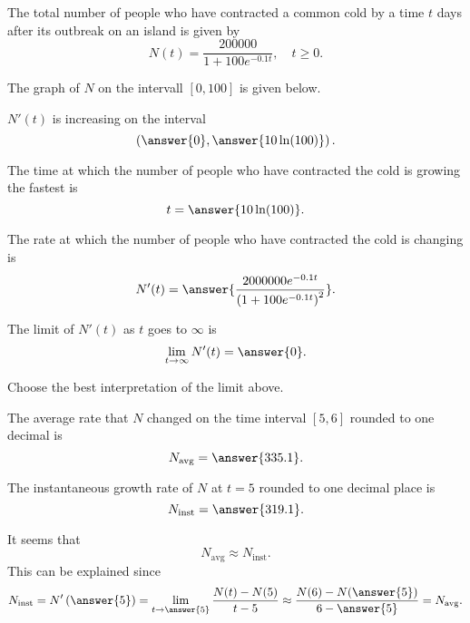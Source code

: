 \documentclass{ximera}
\author{Nela Lakos \and Kyle Parsons}
\begin{document}
\begin{exercise}

The total number of people who have contracted a common cold by a time $t$ days after its outbreak on an island is given by
\[
N(t) = \frac{200000}{1+100e^{-0.1t}},\quad t\geq0.
\]

The graph of $N$ on the intervall $[0,100]$ is given below.

\begin{image}
\end{image}

$N'(t)$ is increasing on the interval
\[
\left(\answer{0},\answer{10 \ln(100)}\right).
\]

The time at which the number of people who have contracted the cold is growing the fastest is
\[
t = \answer{10 \ln(100)}.
\]

The rate at which the number of people who have contracted the cold is changing is
\[
N'(t) = \answer{\frac{2000000e^{-0.1t}}{\left(1+100e^{-0.1t}\right)^2}}.
\]

The limit of $N'(t)$ as $t$ goes to $\infty$ is
\[
\lim_{t\to\infty}N'(t) = \answer{0}.
\]

Choose the best interpretation of the limit above.
\begin{multipleChoice}
\end{multipleChoice}

The average rate that $N$ changed on the time interval $[5,6]$ rounded to one decimal is
\[
N_{\text{avg}} = \answer{335.1}.
\]

The instantaneous growth rate of $N$ at $t=5$ rounded to one decimal place is
\[
N_{\text{inst}} = \answer{319.1}.
\]

It seems that 
\[
N_{\text{avg}}\approx N_{\text{inst}}.
\]
This can be explained since
\[
N_{\text{inst}} = N'\left(\answer{5}\right) = \lim_{t\to\answer{5}}\frac{N(t)-N(5)}{t-5} \approx \frac{N(6) - N(\answer{5})}{6-\answer{5}} = N_{\text{avg}}.
\]

\end{exercise}
\end{document}
